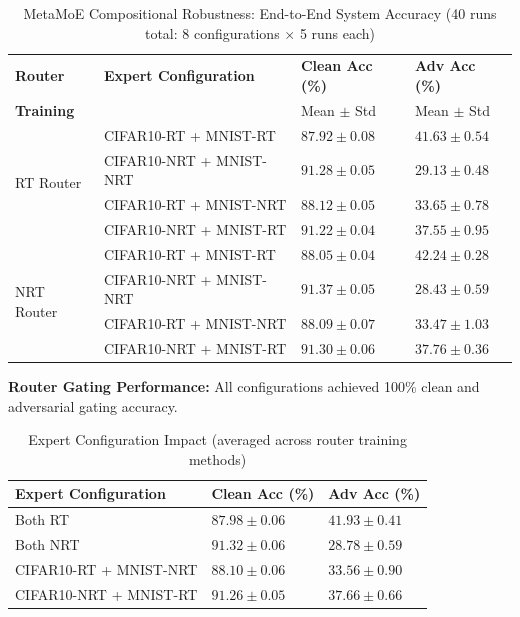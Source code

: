 \documentclass[11pt,a4paper]{article}
\begin{document}
\begin{table}[H]
\centering
\small
\begin{tabular}{llll}
\toprule
\textbf{Router} & \textbf{Expert Configuration} & \textbf{Clean Acc (\%)} & \textbf{Adv Acc (\%)} \\
\textbf{Training} & & Mean $\pm$ Std & Mean $\pm$ Std \\
\midrule
\multirow{4}{*}{RT Router} & CIFAR10-RT + MNIST-RT & $87.92 \pm 0.08$ & $41.63 \pm 0.54$ \\
& CIFAR10-NRT + MNIST-NRT & $91.28 \pm 0.05$ & $29.13 \pm 0.48$ \\
& CIFAR10-RT + MNIST-NRT & $88.12 \pm 0.05$ & $33.65 \pm 0.78$ \\
& CIFAR10-NRT + MNIST-RT & $91.22 \pm 0.04$ & $37.55 \pm 0.95$ \\
\midrule
\multirow{4}{*}{NRT Router} & CIFAR10-RT + MNIST-RT & $88.05 \pm 0.04$ & $42.24 \pm 0.28$ \\
& CIFAR10-NRT + MNIST-NRT & $91.37 \pm 0.05$ & $28.43 \pm 0.59$ \\
& CIFAR10-RT + MNIST-NRT & $88.09 \pm 0.07$ & $33.47 \pm 1.03$ \\
& CIFAR10-NRT + MNIST-RT & $91.30 \pm 0.06$ & $37.76 \pm 0.36$ \\
\bottomrule
\end{tabular}
\caption{MetaMoE Compositional Robustness: End-to-End System Accuracy (40 runs total: 8 configurations $\times$ 5 runs each)}
\end{table}

\textbf{Router Gating Performance:} All configurations achieved 100\% clean and adversarial gating accuracy.

\begin{table}[H]
\centering
\small
\begin{tabular}{lll}
\toprule
\textbf{Expert Configuration} & \textbf{Clean Acc (\%)} & \textbf{Adv Acc (\%)} \\
\midrule
Both RT & $87.98 \pm 0.06$ & $41.93 \pm 0.41$ \\
Both NRT & $91.32 \pm 0.06$ & $28.78 \pm 0.59$ \\
CIFAR10-RT + MNIST-NRT & $88.10 \pm 0.06$ & $33.56 \pm 0.90$ \\
CIFAR10-NRT + MNIST-RT & $91.26 \pm 0.05$ & $37.66 \pm 0.66$ \\
\bottomrule
\end{tabular}
\caption{Expert Configuration Impact (averaged across router training methods)}
\end{table}
\end{document}
